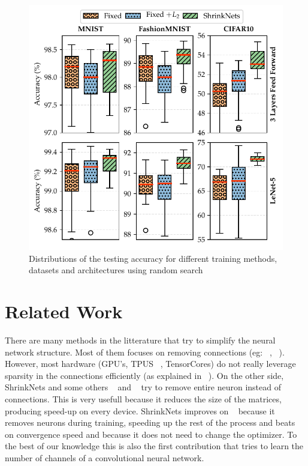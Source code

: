 \documentclass[sigconf]{acmart}
\begin{document}
\begin{figure}
\begin{center}
  \includegraphics[width=0.9\columnwidth]{hyper_opt}
\caption{Distributions of the testing accuracy for different training methods, datasets and architectures using random search\label{hyper_opt_res}}
\end{center}
\end{figure}

\section{Related Work}

\par There are many methods in the litterature that try to simplify the neural
network structure. Most of them focuses on removing connections (eg: ~\cite{Cun},
~\cite{Han2015}).  However, most hardware (GPU's, TPUS ~\cite{Jouppi2017}, TensorCores) do not really
leverage sparsity in the connections efficiently (as explained in ~\cite{Han2016}). On the other side, ShrinkNets
and some others ~\cite{Scardapane2017} and ~\cite{Philipp} try to remove entire neuron instead of
connections. This is very usefull because it reduces the size of the matrices,
producing speed-up on every device. ShrinkNets improves on
~\cite{Scardapane2017} because it removes neurons during training, speeding up
the rest of the process and beats ~\cite{Philipp} on convergence speed and because it
does not need to change the optimizer. To the best of our knowledge this is
also the first contribution that tries to learn the number of channels of a
convolutional neural network.
\end{document}
